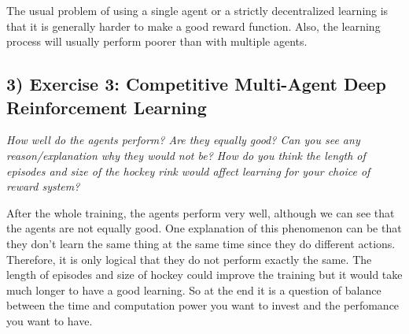 \documentclass[10pt]{article}
\begin{document}
The usual problem of using a single agent or a strictly decentralized learning is that
 it is generally harder to make a good reward function. Also, the learning process will
 usually perform poorer than with multiple agents.


\subsection*{3) \textbf{ Exercise 3: Competitive Multi-Agent Deep Reinforcement Learning}}
\textit{How well do the agents perform? Are they equally good? Can you see any 
reason/explanation why they would not be? How do you think the length of episodes and
 size of the hockey rink would affect learning for your choice of reward system?} \medskip

After the whole training, the agents perform very well, although we can see that the
 agents are not equally good. One explanation of this phenomenon can be that they don't
 learn the same thing at the same time since they do different actions. Therefore, it
 is only logical that they do not perform exactly the same. The length of episodes and
 size of hockey could improve the training but it would take much longer to have a good
 learning. So at the end it is a question of balance between the time and computation
 power you want to invest and the perfomance you want to have. 
\end{document}
